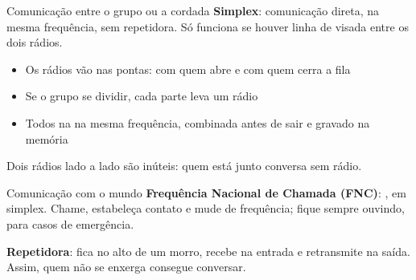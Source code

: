 
\begin{frame}{Comunicação entre o grupo ou a cordada}
  \textbf{Simplex}: comunicação direta, na mesma frequência, sem repetidora. Só funciona se houver \alert{linha de visada} entre os dois rádios.

  \medskip
  \begin{itemize}
  \item Os rádios vão \alert{nas pontas}: com quem abre e com quem cerra a fila
  \item Se o grupo se dividir, cada parte leva um rádio
  \item Todos na \alert{na mesma frequência}, combinada antes de sair e gravado na memória
  \end{itemize}

  \medskip
  \begin{atencao}
    Dois rádios lado a lado são inúteis: quem está junto conversa sem rádio.
  \end{atencao}
\end{frame}

\begin{frame}{Comunicação com o mundo}
  \textbf{Frequência Nacional de Chamada (FNC)}: \alert<1>{, em simplex}. Chame, estabeleça contato e mude de frequência; fique sempre ouvindo, para casos de emergência.

  \pause
  \medskip
  \textbf{Repetidora}: fica no alto de um morro, recebe na \alert{entrada} e retransmite na
  \alert{saída}. Assim, quem não se enxerga consegue conversar.

  \smallskip
  \centering
\end{frame}


